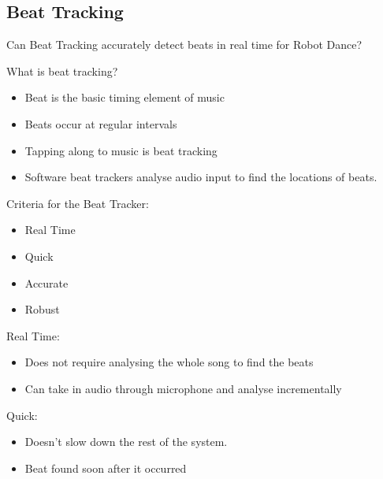 \documentclass{beamer}
\begin{document}
	\subsection{Beat Tracking}
	\begin{frame}
		\subsectionpage
	\end{frame}
	\begin{frame}
		Can Beat Tracking accurately detect beats in real time for Robot Dance?
	\end{frame}
	\begin{frame}
		What is beat tracking?
		\begin{itemize}
			\item Beat is the basic timing element of music
			\item Beats occur at regular intervals
			\item Tapping along to music is beat tracking
			\item Software beat trackers analyse audio input to find the locations of beats.
		\end{itemize}
	\end{frame}
	\begin{frame}
		Criteria for the Beat Tracker:
		\begin{itemize}
			\item Real Time %
			\item Quick %
			\item Accurate %
			\item Robust	%
		\end{itemize}
	\end{frame}
	\begin{frame}
		Real Time:
		\begin{itemize}
			\item Does not require analysing the whole song to find the beats
			\item Can take in audio through microphone and analyse incrementally
		\end{itemize}
	\end{frame}
	\begin{frame}
		Quick:
		\begin{itemize}
			\item Doesn't slow down the rest of the system.
			\item Beat found soon after it occurred
		\end{itemize}
	\end{frame}
\end{document}
